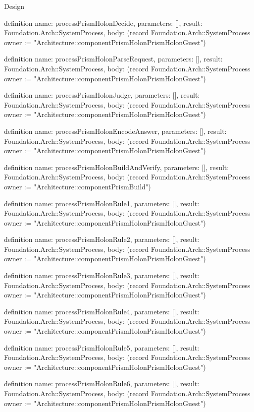 \begin{lexlean}{Design}
\begin{semanticmodule}
definition{
  name: processPrismHolonDecide,
  parameters: [],
  result: Foundation.Arch::SystemProcess,
  body: (record Foundation.Arch::SystemProcess {owner := "Architecture::componentPrismHolonPrismHolonGuest"})
}

definition{
  name: processPrismHolonParseRequest,
  parameters: [],
  result: Foundation.Arch::SystemProcess,
  body: (record Foundation.Arch::SystemProcess {owner := "Architecture::componentPrismHolonPrismHolonGuest"})
}

definition{
  name: processPrismHolonJudge,
  parameters: [],
  result: Foundation.Arch::SystemProcess,
  body: (record Foundation.Arch::SystemProcess {owner := "Architecture::componentPrismHolonPrismHolonGuest"})
}

definition{
  name: processPrismHolonEncodeAnswer,
  parameters: [],
  result: Foundation.Arch::SystemProcess,
  body: (record Foundation.Arch::SystemProcess {owner := "Architecture::componentPrismHolonPrismHolonGuest"})
}

definition{
  name: processPrismHolonBuildAndVerify,
  parameters: [],
  result: Foundation.Arch::SystemProcess,
  body: (record Foundation.Arch::SystemProcess {owner := "Architecture::componentPrismBuild"})
}

definition{
  name: processPrismHolonRule1,
  parameters: [],
  result: Foundation.Arch::SystemProcess,
  body: (record Foundation.Arch::SystemProcess {owner := "Architecture::componentPrismHolonPrismHolonGuest"})
}

definition{
  name: processPrismHolonRule2,
  parameters: [],
  result: Foundation.Arch::SystemProcess,
  body: (record Foundation.Arch::SystemProcess {owner := "Architecture::componentPrismHolonPrismHolonGuest"})
}

definition{
  name: processPrismHolonRule3,
  parameters: [],
  result: Foundation.Arch::SystemProcess,
  body: (record Foundation.Arch::SystemProcess {owner := "Architecture::componentPrismHolonPrismHolonGuest"})
}

definition{
  name: processPrismHolonRule4,
  parameters: [],
  result: Foundation.Arch::SystemProcess,
  body: (record Foundation.Arch::SystemProcess {owner := "Architecture::componentPrismHolonPrismHolonGuest"})
}

definition{
  name: processPrismHolonRule5,
  parameters: [],
  result: Foundation.Arch::SystemProcess,
  body: (record Foundation.Arch::SystemProcess {owner := "Architecture::componentPrismHolonPrismHolonGuest"})
}

definition{
  name: processPrismHolonRule6,
  parameters: [],
  result: Foundation.Arch::SystemProcess,
  body: (record Foundation.Arch::SystemProcess {owner := "Architecture::componentPrismHolonPrismHolonGuest"})
}


\end{semanticmodule}
\end{lexlean}
